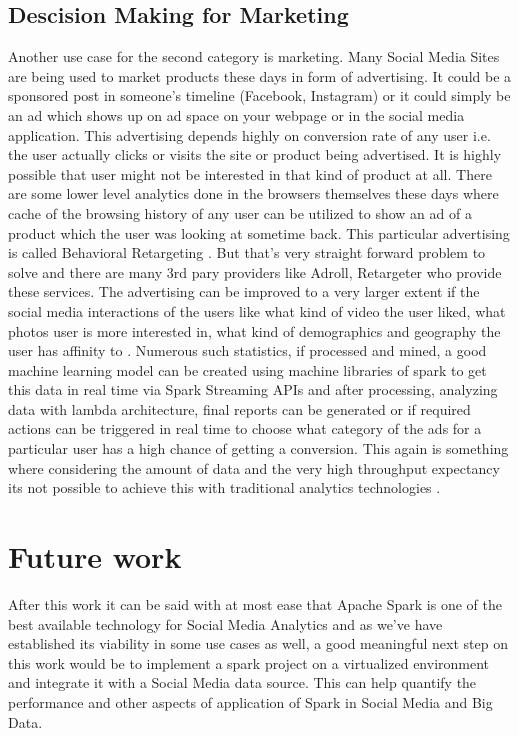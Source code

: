 \documentclass[sigconf]{acmart}
\begin{document}
\subsection{Descision Making for Marketing}
Another use case for the second category is marketing. Many Social Media Sites are being used to market products these days in form of advertising. It could be a sponsored post in someone's timeline (Facebook, Instagram) or it could simply be an ad which shows up on ad space on your webpage or in the social media application. This advertising depends highly on conversion rate of any user i.e. the user actually clicks or visits the site or product being advertised. It is highly possible that user might not be interested in that kind of product at all. There are some lower level analytics done in the browsers themselves these days where cache of the browsing history of any user can be utilized to show an ad of a product which the user was looking at sometime back. This particular advertising is called Behavioral Retargeting  \cite{bretargeting}. But that's very straight forward problem to solve and there are many 3rd pary providers like Adroll, Retargeter who provide these services. The advertising can be improved to a very larger extent if the social media interactions of the users like what kind of video the user liked, what photos user is more interested in, what kind of demographics and geography the user has affinity to  \cite{likematters}. Numerous such statistics, if processed and mined, a good machine learning model can be created using machine libraries of spark to get this data in real time via Spark Streaming APIs and after processing, analyzing data with lambda architecture, final reports can be generated or if required actions can be triggered in real time to choose what category of the ads for a particular user has a high chance of getting a conversion. This again is something where considering the amount of data and the very high throughput expectancy its not possible to achieve this with traditional analytics technologies \cite{krishnan}.
\section{Future work}
After this work it can be said with at most ease that Apache Spark is one of the best available technology for Social Media Analytics and as we've have established its viability in some use cases as well, a good meaningful next step on this work would be to implement a spark project on a virtualized environment and integrate it with a Social Media data source. This can help quantify the performance and other aspects of application of Spark in Social Media and Big Data.
\end{document}
